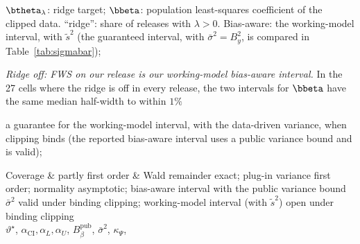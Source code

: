 $\btheta_\lambda$: ridge target; $\bbeta$: population least-squares coefficient of the clipped data. ``ridge'': share of releases with $\lambda > 0$. Bias-aware: the working-model interval, with $\tilde s^2$ (the guaranteed interval, with $\bar\sigma^2 = B_y^2$, is compared in Table~\ref{tab:sigmabar});

  \item \emph{Ridge off: FWS on our release is our working-model bias-aware interval.} In the 27 cells where the ridge is off in every release, the two intervals for $\bbeta$ have the same median half-width to within $1\%$

a guarantee for the working-model interval, with the data-driven variance, when clipping binds (the reported bias-aware interval uses a public variance bound and is valid);

Coverage & partly first order & Wald remainder exact; plug-in variance first order; normality asymptotic; bias-aware interval with the public variance bound $\bar\sigma^2$ valid under binding clipping; working-model interval (with $\tilde s^2$) open under binding clipping \\

$\vartheta^\star$, $\alpha_{\mathrm{CI}},\alpha_L,\alpha_U$, $B_\beta^{\mathrm{pub}}$, $\bar\sigma^2$, $\kappa_\Psi$,

